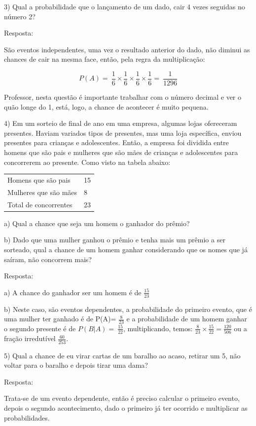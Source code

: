 3) Qual a probabilidade que o lançamento de um dado, cair 4 vezes
seguidas no número 2?

Resposta:

São eventos independentes, uma vez o resultado anterior do dado, não
diminui as chances de cair na mesma face, então, pela regra da
multiplicação:

\[P(A) = \ \frac{1}{6} \times \frac{1}{6} \times \frac{1}{6} \times \frac{1}{6} = \ \frac{1}{1296}\]

Professor, nesta questão é importante trabalhar com o número decimal e
ver o quão longe do 1, está, logo, a chance de acontecer é muito
pequena.

4) Em um sorteio de final de ano em uma empresa, algumas lojas
ofereceram presentes. Haviam variados tipos de presentes, mas uma loja
específica, enviou presentes para crianças e adolescentes. Então, a
empresa foi dividida entre homens que são pais e mulheres que são mães
de crianças e adolescentes para concorrerem ao presente. Como visto na
tabela abaixo:

\begin{longtable}[]{@{}ll@{}}
\toprule
\endhead
Homens que são pais & 15\tabularnewline
Mulheres que são mães & 8\tabularnewline
Total de concorrentes & 23\tabularnewline
\bottomrule
\end{longtable}

a) Qual a chance que seja um homem o ganhador do prêmio?

b) Dado que uma mulher ganhou o prêmio e tenha mais um prêmio a ser
sorteado, qual a chance de um homem ganhar considerando que os nomes que
já saíram, não concorrem mais?

Resposta:

a) A chance do ganhador ser um homem é de \(\frac{15}{23}\)

b) Neste caso, são eventos dependentes, a probabilidade do primeiro
evento, que é uma mulher ter ganhado é de P(A)= \(\frac{8}{23}\) e a
probabilidade de um homem ganhar o segundo presente é de
\(P(B|A) = \ \frac{15}{22}\), multiplicando, temos:
\(\frac{8}{23} \times \frac{15}{22} = \frac{120}{506}\) ou a fração
irredutível \(\frac{60}{253}.\)

5) Qual a chance de eu virar cartas de um baralho ao acaso, retirar um
5, não voltar para o baralho e depois tirar uma dama?

Resposta:

Trata-se de um evento dependente, então é preciso calcular o primeiro
evento, depois o segundo acontecimento, dado o primeiro já ter ocorrido
e multiplicar as probabilidades.

